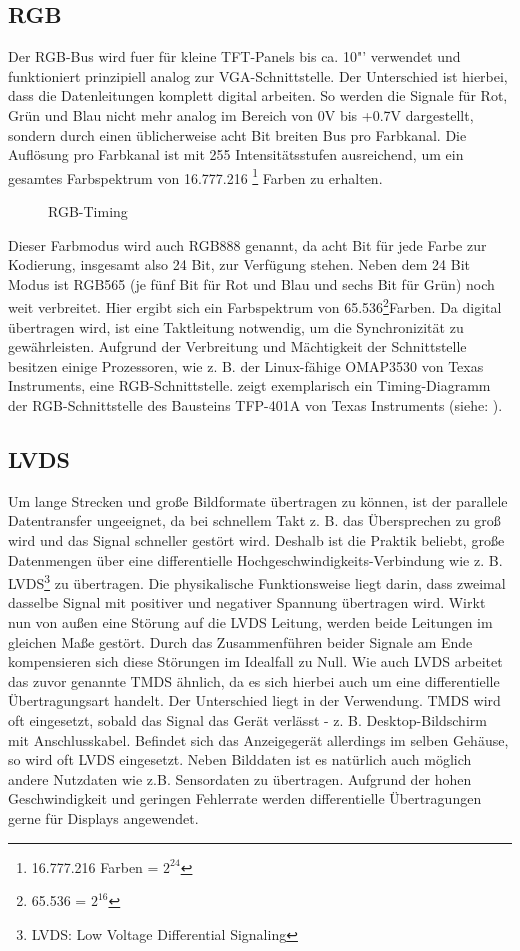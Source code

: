 \subsection{RGB}
Der RGB-Bus wird fuer für kleine TFT-Panels bis ca. 10"' verwendet und funktioniert prinzipiell analog zur VGA-Schnittstelle. Der Unterschied ist hierbei, dass die Datenleitungen komplett digital arbeiten. So werden die Signale für Rot, Grün und Blau nicht mehr analog im Bereich von 0V bis +0.7V dargestellt, sondern durch einen üblicherweise acht Bit breiten Bus pro Farbkanal. Die Auflösung pro Farbkanal ist mit 255 Intensitätsstufen ausreichend, um ein gesamtes Farbspektrum von 16.777.216 \footnote{16.777.216 Farben = $2^{24}$} Farben zu erhalten. 
\begin{figure}[htp]
	\centering
{}
	\caption{RGB-Timing}
	\label{fig:rgb_timing}
\end{figure}
Dieser Farbmodus wird auch RGB888 genannt, da acht Bit für jede Farbe zur Kodierung, insgesamt also 24 Bit, zur Verfügung stehen. Neben dem 24 Bit Modus ist RGB565 (je fünf Bit für Rot und Blau und sechs Bit für Grün) noch weit verbreitet. Hier ergibt sich ein Farbspektrum von 65.536\footnote{65.536 = $2^{16}$}Farben. Da digital übertragen wird, ist eine Taktleitung notwendig, um die Synchronizität zu gewährleisten. 
Aufgrund der Verbreitung und Mächtigkeit der Schnittstelle besitzen einige Prozessoren, wie z. B. der Linux-fähige OMAP3530 von Texas Instruments, eine RGB-Schnittstelle. 
 zeigt exemplarisch ein Timing-Diagramm der RGB-Schnittstelle des Bausteins TFP-401A von Texas Instruments (siehe: \cite{TI2011}).
\subsection{LVDS}
Um lange Strecken und große Bildformate übertragen zu können, ist der parallele Datentransfer ungeeignet, da bei schnellem Takt z. B. das Übersprechen zu groß wird und das Signal schneller gestört wird. Deshalb ist die Praktik beliebt, große Datenmengen über eine differentielle Hochgeschwindigkeits-Verbindung wie z. B. LVDS\footnote{LVDS: Low Voltage Differential Signaling} zu übertragen. Die physikalische Funktionsweise liegt darin, dass zweimal dasselbe Signal mit positiver und negativer Spannung übertragen wird. Wirkt nun von außen eine Störung auf die LVDS Leitung, werden beide Leitungen im gleichen Maße gestört. Durch das Zusammenführen beider Signale am Ende kompensieren sich diese Störungen im Idealfall zu Null. Wie auch LVDS arbeitet das zuvor genannte TMDS ähnlich, da es sich hierbei auch um eine differentielle Übertragungsart handelt. Der Unterschied liegt in der Verwendung. TMDS wird oft eingesetzt, sobald das Signal das Gerät verlässt - z. B. Desktop-Bildschirm mit Anschlusskabel. Befindet sich das Anzeigegerät allerdings im selben Gehäuse, so wird oft LVDS eingesetzt. Neben Bilddaten ist es natürlich auch möglich andere Nutzdaten wie z.B. Sensordaten zu übertragen. 
Aufgrund der hohen Geschwindigkeit und geringen Fehlerrate werden differentielle Übertragungen gerne für Displays angewendet.
